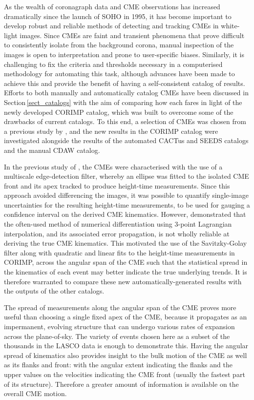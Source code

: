 \documentclass[referee,a4paper,12pt,traditabstract]{swsc}
\begin{document}
\begin{linenumbers}
As the wealth of coronagraph data and CME observations has increased dramatically since the launch of SOHO in 1995, it has become important to develop robust and reliable methods of detecting and tracking CMEs in white-light images. Since CMEs are faint and transient phenomena that prove difficult to consistently isolate from the background corona, manual inspection of the images is open to interpretation and prone to user-specific biases. Similarly, it is challenging to fix the criteria and thresholds necessary in a computerised methodology for automating this task, although advances have been made to achieve this and provide the benefit of having a self-consistent catalog of results. Efforts to both manually and automatically catalog CMEs have been discussed in Section\,\ref{sect_catalogs} with the aim of comparing how each fares in light of the newly developed CORIMP catalog, which was built to overcome some of the drawbacks of current catalogs. To this end, a selection of CMEs was chosen from a previous study by \cite{2009A&A...495..325B}, and the new results in the CORIMP catalog were investigated alongside the results of the automated CACTus and SEEDS catalogs and the manual CDAW catalog. 

In the previous study of \cite{2009A&A...495..325B}, the CMEs were characterised with the use of a multiscale edge-detection filter, whereby an ellipse was fitted to the isolated CME front and its apex tracked to produce height-time measurements. Since this approach avoided differencing the images, it was possible to quantify single-image uncertainties for the resulting height-time measurements, to be used for gauging a confidence interval on the derived CME kinematics. However, \cite{2013A&A...557A..96B} demonstrated that the often-used method of numerical differentiation using 3-point Lagrangian interpolation, and its associated error propagation, is not wholly reliable at deriving the true CME kinematics. This motivated the use of the Savitzky-Golay filter along with quadratic and linear fits to the height-time measurements in CORIMP, across the angular span of the CME such that the statistical spread in the kinematics of each event may better indicate the true underlying trends. It is therefore warranted to compare these new automatically-generated results with the outputs of the other catalogs.

The spread of measurements along the angular span of the CME proves more useful than choosing a single fixed apex of the CME, because it propagates as an impermanent, evolving structure that can undergo various rates of expansion across the plane-of-sky. The variety of events chosen here as a subset of the thousands in the LASCO data is enough to demonstrate this. Having the angular spread of kinematics also provides insight to the bulk motion of the CME as well as its flanks and front: with the angular extent indicating the flanks and the upper values on the velocities indicating the CME front (usually the fastest part of its structure). Therefore a greater amount of information is available on the overall CME motion.


\end{linenumbers}
\end{document}
